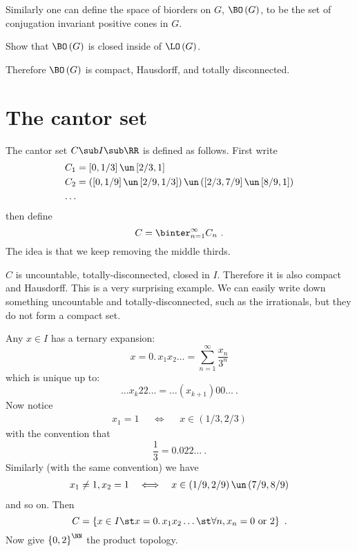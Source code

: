 Similarly one can define the space of biorders on $G$, $\BO\left(G\right)$, to be 
the set of conjugation invariant positive cones in $G$.

\begin{exr}
Show that $\BO\left(G\right)$ is closed inside of $\LO\left(G\right)$.
\end{exr}

Therefore $\BO\left(G\right)$ is compact, Hausdorff, and totally disconnected.

\section{The cantor set}

The cantor set $C\sub I\sub \RR$ is defined as follows.
First write
\begin{align*}
C_1 &= \left[0,1/3\right] \un \left[2/3 , 1\right] \\
C_2 &= \left(\left[0,1/9\right]\un \left[2/9, 1/3\right]\right)\un
\left(\left[2/3, 7/9\right]\un \left[8/9, 1\right]\right) \\
\ldots &
\end{align*}
then define
\begin{equation}
C = \binter_{n = 1}^\infty C_n \ .
\end{equation}
The idea is that we keep removing the middle thirds. 

$C$ is uncountable, totally-disconnected, closed in $I$. 
Therefore it is also compact and Hausdorff.
This is a very surprising example.
We can easily write down something uncountable and totally-disconnected, such as the
irrationals, but they do not form a compact set.

Any $x\in I$ has a ternary expansion:
\begin{equation*}
x = 0.\, x_1 x_2 \ldots = \sum_{n = 1}^\infty \frac{x_n}{3^n}
\end{equation*}
which is unique up to:
\begin{equation*}
\ldots x_k 22\ldots = \ldots \left(x_{k+1}\right)0 0 \ldots
\ .
\end{equation*}
Now notice
\begin{align*}
x_1 = 1 && \iff && x\in \left(1/3 , 2/3\right)
\end{align*}
with the convention that 
\begin{equation*}
\frac{1}{3} = 0.022 \ldots
\ .
\end{equation*}
Similarly (with the same convention) we have
\begin{align*}
x_1 \neq 1, x_2 = 1 && \iff &&
x\in \left(1/9 , 2/9\right)\un\left(7/9 , 8/9\right)
\end{align*}
and so on. Then 
\begin{equation}
C = \left\{x\in I \st x= 0.\, x_1 x_2 \ldots \st \forall n, x_n = 0 \text{ or } 2\right\}
\ .
\end{equation}
Now give $\left\{0,2\right\}^\NN$ the product topology. 

